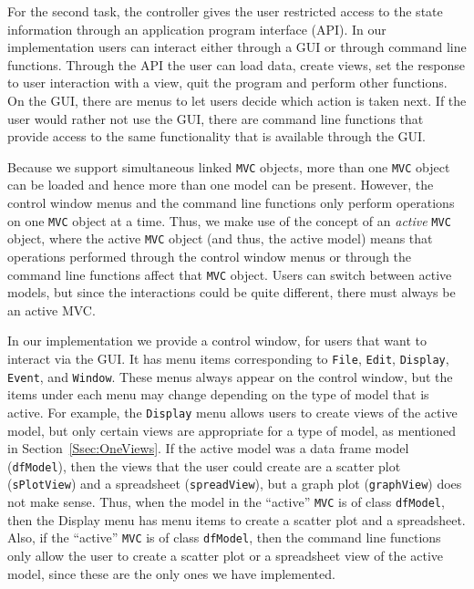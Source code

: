 \documentclass{article}[11pt]
\newcommand{\Robject}[1]{{\texttt{#1}}}
\newcommand{\Rclass}[1]{\texttt{#1}}
\begin{document}
For the second task, the controller gives the user restricted access
to the state information through an application program interface
(API). In our implementation users can interact either through a GUI
or through command line functions.  Through the API the user can load
data, create views, set the response to user interaction with a view,
quit the program and perform other functions.  On the GUI, there are
menus to let users decide which action is taken next.  If the user
would rather not use the GUI, there are command line functions that
provide access to the same functionality that is available through the
GUI.  



Because we support simultaneous linked \Robject{MVC}
objects, more than one \Robject{MVC} object can be loaded and hence
more than one model can be present. However, the control window menus
and the command line functions only perform operations on one
\Robject{MVC} object at a time.  Thus, we make use of the concept of
an \textit{active} \Robject{MVC} object, where the active
\Robject{MVC} object (and thus, the active model) means that
operations performed through the control window menus or through the
command line functions affect that \Robject{MVC} object. Users can
switch between active models, but since the interactions could be
quite different, there must always be an active MVC. 

In our implementation we provide a control window, for users that want
to interact via the GUI.  It has menu items corresponding to
\texttt{File}, \texttt{Edit}, \texttt{Display}, \texttt{Event}, and
\texttt{Window}.  These menus always appear on the control window, but
the items under each menu may change depending on the type of model
that is active.  For example, the \texttt{Display} menu allows users
to create views of the active model, but only certain views are
appropriate for a type of model, as mentioned in
Section~\ref{Ssec:OneViews}.  If the active model was a data frame
model (\Rclass{dfModel}), then the views that the user could create
are a scatter plot (\Rclass{sPlotView}) and a spreadsheet
(\Rclass{spreadView}), but a graph plot (\Rclass{graphView}) does not
make sense.  Thus, when the model in the ``active'' \Robject{MVC} is
of class \Rclass{dfModel}, then the Display menu has menu items to
create a scatter plot and a spreadsheet.  Also, if the ``active''
\Robject{MVC} is of class \Rclass{dfModel}, then the command line
functions only allow the user to create a scatter plot or a spreadsheet
view of the active model, since these are the only ones we have
implemented.
\end{document}
